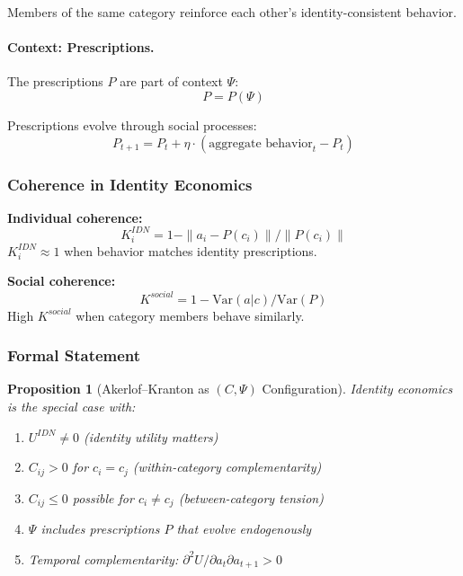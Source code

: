 \documentclass[12pt,a4paper]{article}
\newtheorem{proposition}[theorem]{Proposition}
\begin{document}
Members of the same category reinforce each other's identity-consistent behavior.

\paragraph{Context: Prescriptions.}
The prescriptions $P$ are part of context $\Psi$:
\begin{equation}
  P = P(\Psi)
\end{equation}

Prescriptions evolve through social processes:
\begin{equation}
  P_{t+1} = P_t + \eta \cdot (\text{aggregate behavior}_t - P_t)
\end{equation}

\subsubsection{Coherence in Identity Economics}

\textbf{Individual coherence:}
\begin{equation}
  K_i^{IDN} = 1 - \|a_i - P(c_i)\| / \|P(c_i)\|
\end{equation}
$K_i^{IDN} \approx 1$ when behavior matches identity prescriptions.

\textbf{Social coherence:}
\begin{equation}
  K^{social} = 1 - \text{Var}(a | c) / \text{Var}(P)
\end{equation}
High $K^{social}$ when category members behave similarly.

\subsubsection{Formal Statement}

\begin{proposition}[Akerlof--Kranton as $(C, \Psi)$ Configuration]
Identity economics is the special case with:
\begin{enumerate}
  \item $U^{IDN} \neq 0$ (identity utility matters)
  \item $C_{ij} > 0$ for $c_i = c_j$ (within-category complementarity)
  \item $C_{ij} \leq 0$ possible for $c_i \neq c_j$ (between-category tension)
  \item $\Psi$ includes prescriptions $P$ that evolve endogenously
  \item Temporal complementarity: $\partial^2 U / \partial a_t \partial a_{t+1} > 0$
\end{enumerate}
\end{proposition}
\end{document}
